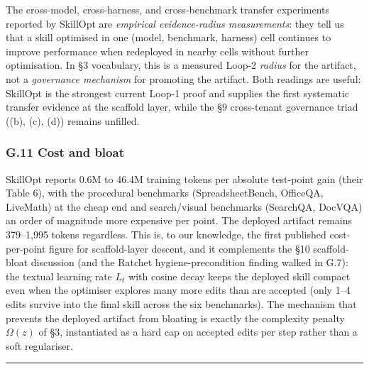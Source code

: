 The cross-model, cross-harness, and cross-benchmark transfer experiments
reported by SkillOpt are \emph{empirical evidence-radius measurements}:
they tell us that a skill optimised in one (model, benchmark, harness)
cell continues to improve performance when redeployed in nearby cells
without further optimisation. In §3 vocabulary, this is a measured
Loop-2 \emph{radius} for the artifact, not a \emph{governance mechanism}
for promoting the artifact. Both readings are useful: SkillOpt is the
strongest current Loop-1 proof and supplies the first systematic
transfer evidence at the scaffold layer, while the §9 cross-tenant
governance triad ((b), (c), (d)) remains unfilled.

\subsubsection{G.11 Cost and bloat}\label{g.11-cost-and-bloat}

SkillOpt reports 0.6M to 46.4M training tokens per absolute test-point
gain (their Table 6), with the procedural benchmarks (SpreadsheetBench,
OfficeQA, LiveMath) at the cheap end and search/visual benchmarks
(SearchQA, DocVQA) an order of magnitude more expensive per point. The
deployed artifact remains 379--1,995 tokens regardless. This is, to our
knowledge, the first published cost-per-point figure for scaffold-layer
descent, and it complements the §10 scaffold-bloat discussion (and the
Ratchet hygiene-precondition finding walked in G.7): the textual
learning rate \(L_t\) with cosine decay keeps the deployed skill compact
even when the optimiser explores many more edits than are accepted (only
1--4 edits survive into the final skill across the six benchmarks). The
mechanism that prevents the deployed artifact from bloating is exactly
the complexity penalty \(\Omega(z)\) of §3, instantiated as a hard cap
on accepted edits per step rather than a soft regulariser.

\begin{center}\rule{0.5\linewidth}{0.5pt}\end{center}
